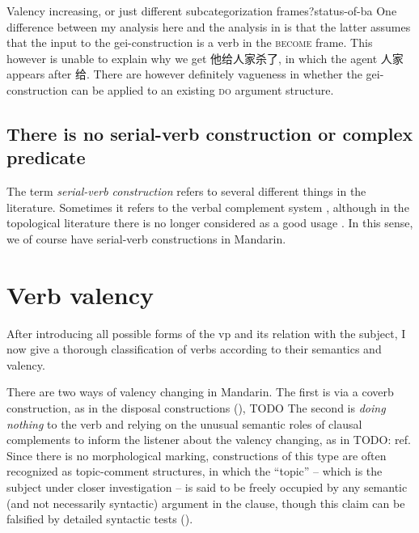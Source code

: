 \documentclass[UTF8, a4paper, oneside, scheme=plain]{ctexrep}
\newcommand*{\citesec}[1]{\S~{#1}}
\newcommand*{\citepage}[1]{p.~{#1}}
\newcommand*{\term}[1]{\emph{#1}}
\newcommand*{\category}[1]{\textsc{#1}}
\begin{document}
\begin{infobox}{Valency increasing, or just different subcategorization frames?}{status-of-ba}
    One difference between my analysis here and the analysis in \citet[\citepage{202}]{deng2010formal}
    is that the latter assumes that the input to the gei-construction 
    is a verb in the \category{become} frame.
    This however is unable to explain why we get 他给人家杀了,
    in which the agent 人家 appears after 给.
    There are however definitely vagueness in whether 
    the gei-construction can be applied to an existing \category{do} argument structure.
\end{infobox}

\section{There is no serial-verb construction or complex predicate}\label{sec:no-serial-verb}

The term \term{serial-verb construction} refers to several different things in the literature.
Sometimes it refers to the verbal complement system
\citep{chen2016mandarin}, 
although in the topological literature 
there is no longer considered as a good usage 
\citep[\citesec{10.1}; note that %
the V2s in Yakkha complex predication highly resembles Mandarin directional verbal complements 
in their formal aspects]{schackow2015grammar}. 
In this sense, we of course have serial-verb constructions in Mandarin.

\chapter{Verb valency}

After introducing all possible forms of the \acs{vp}
and its relation with the subject,
I now give a thorough classification of verbs 
according to their semantics and valency.

There are two ways of valency changing in Mandarin.
The first is via a coverb construction, 
as in the disposal constructions (),
TODO 
The second is \emph{doing nothing} to the verb 
and relying on the unusual semantic roles of clausal complements 
to inform the listener about the valency changing,
as in TODO: ref.
Since there is no morphological marking,
constructions of this type are often recognized as topic-comment structures,
in which the ``topic'' -- which is the subject under closer investigation -- 
is said to be freely occupied by any semantic (and not necessarily syntactic) argument in the clause,
though this claim can be falsified by detailed syntactic tests ().
\end{document}
